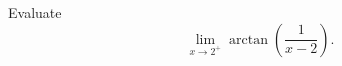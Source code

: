 \begin{frame}
\begin{example}
Evaluate 
\[
\lim_{x\rightarrow 2^+} \arctan \left( \frac{1}{x-2}\right) .
\]
\end{example}
\end{frame}
